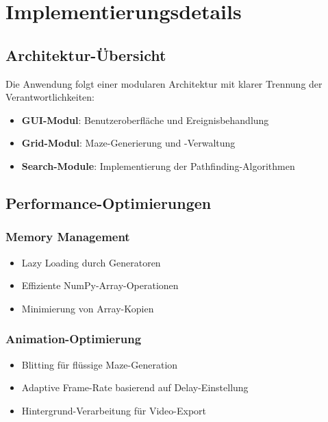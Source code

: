 \documentclass[12pt,a4paper]{article}
\begin{document}
\section{Implementierungsdetails}

\subsection{Architektur-Übersicht}

Die Anwendung folgt einer modularen Architektur mit klarer Trennung der Verantwortlichkeiten:

\begin{itemize}
    \item \textbf{GUI-Modul}: Benutzeroberfläche und Ereignisbehandlung
    \item \textbf{Grid-Modul}: Maze-Generierung und -Verwaltung
    \item \textbf{Search-Module}: Implementierung der Pathfinding-Algorithmen
\end{itemize}

\subsection{Performance-Optimierungen}

\subsubsection{Memory Management}
\begin{itemize}
    \item Lazy Loading durch Generatoren
    \item Effiziente NumPy-Array-Operationen
    \item Minimierung von Array-Kopien
\end{itemize}

\subsubsection{Animation-Optimierung}
\begin{itemize}
    \item Blitting für flüssige Maze-Generation
    \item Adaptive Frame-Rate basierend auf Delay-Einstellung
    \item Hintergrund-Verarbeitung für Video-Export
\end{itemize}
\end{document}
